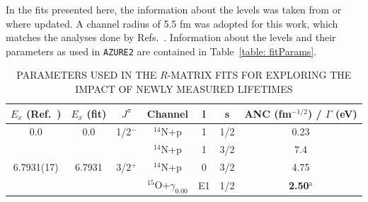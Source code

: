 In the fits presented here, the information about the levels was taken from  \citet{Ajzenberg-Selove1991} or \citet{Daigle2016} where updated. A channel radius of 5.5 fm was adopted for this work, which matches the analyses done by Refs.~\cite{Adelberger2011, Li2016, Wagner2018}. Information about the levels and their parameters as used in \texttt{AZURE2} are contained in Table~\ref{table: fitParams}. 


\begin{table}[]
\caption{PARAMETERS USED IN THE $R$-MATRIX FITS FOR EXPLORING THE IMPACT OF NEWLY MEASURED LIFETIMES}
\begin{center}
\begin{threeparttable}
\begin{tabular}{c  c  c  c  c  c  c}
\toprule
$E_x$ (Ref.~\cite{Ajzenberg-Selove1991}) &   $E_x$ (fit) & $J^\pi$ & Channel & l & s & ANC (fm$^{-1/2}$) / $\Gamma$ (eV)\\ 
\midrule
0.0 & 0.0	& 1/2$^-$ &	$^{14}$N+p &	1&	1/2&	{0.23}\\
	&	&	    &    $^{14}$N+p &	1&	3/2&	{7.4} \\
6.7931(17) & {6.7931}&	3/2$^+$ & $^{14}$N+p &	0&	3/2&	{4.75}\\
	&	&	     &  $^{15}$O+$\gamma_{0.00}$	&  E1  &	1/2&	\textbf{2.50$^{\text{a}}$}\\

\end{tabular}
\end{threeparttable}
\end{center}
\end{table}
